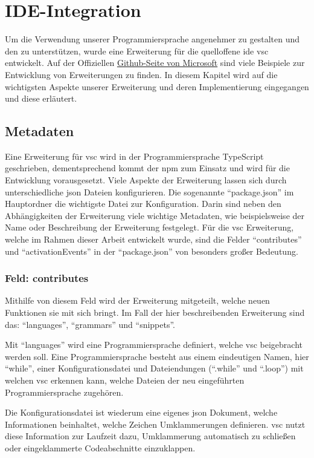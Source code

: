 \chapter{IDE-Integration} \label{chap:ide}
Um die Verwendung unserer Programmiersprache angenehmer zu gestalten und den zu unterstützen, wurde eine Erweiterung für die quelloffene \acs{ide} \ac{vsc} entwickelt.
Auf der Offiziellen \href{https://github.com/microsoft/vscode-extension-samples}{Github-Seite von Microsoft} sind viele Beispiele zur Entwicklung von Erweiterungen zu finden. \cite{MicrosoftCorporation2022}
In diesem Kapitel wird auf die wichtigsten Aspekte unserer Erweiterung und deren Implementierung eingegangen und diese erläutert.


\section{Metadaten}
Eine Erweiterung für \ac{vsc} wird in der Programmiersprache TypeScript geschrieben, dementsprechend kommt der \ac{npm} zum Einsatz und wird für die Entwicklung vorausgesetzt.
Viele Aspekte der Erweiterung lassen sich durch unterschiedliche \ac{json} Dateien konfigurieren. 
Die sogenannte \enquote{package.json} im Hauptordner die wichtigste Datei zur Konfiguration.
Darin sind neben den Abhängigkeiten der Erweiterung viele wichtige Metadaten, wie beispielsweise der Name oder Beschreibung der Erweiterung festgelegt.
Für die \ac{vsc} Erweiterung, welche im Rahmen dieser Arbeit entwickelt wurde, sind die Felder \enquote{contributes} und \enquote{activationEvents} in der \enquote{package.json} von besonders großer Bedeutung.

\subsection{Feld: contributes}
Mithilfe von diesem Feld wird der Erweiterung mitgeteilt, welche neuen Funktionen sie mit sich bringt.
Im Fall der hier beschreibenden Erweiterung sind das: \enquote{languages}, \enquote{grammars} und \enquote{snippets}. 

Mit \enquote{languages} wird eine Programmiersprache definiert, welche \ac{vsc} beigebracht werden soll.
Eine Programmiersprache besteht aus einem eindeutigen Namen, hier \enquote{while}, einer Konfigurationsdatei und Dateiendungen (\enquote{.while} und \enquote{.loop}) mit welchen \ac{vsc} erkennen kann, welche Dateien der neu eingeführten Programmiersprache zugehören.

Die Konfigurationsdatei ist wiederum eine eigenes \ac{json} Dokument, welche Informationen beinhaltet, welche Zeichen Umklammerungen definieren. \ac{vsc} nutzt diese Information zur Laufzeit dazu, Umklammerung automatisch zu schließen oder eingeklammerte Codeabschnitte einzuklappen.

